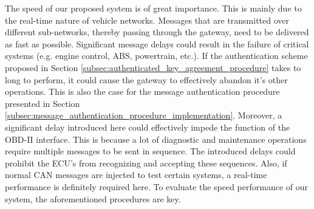 The speed of our proposed system is of great importance. This is mainly due to the real-time nature of vehicle networks. Messages that are transmitted over different sub-networks, thereby passing through the gateway, need to be delivered as fast as possible. Significant message delays could result in the failure of critical systems (e.g. engine control, ABS, powertrain, etc.). If the authentication scheme proposed in Section \ref{subsec:authenticated_key_agreement_procedure} takes to long to perform, it could cause the gateway to effectively abandon it's other operations. This is also the case for the message authentication procedure presented in Section \ref{subsec:message_authentication_procedure_implementation}. Moreover, a significant delay introduced here could effectively impede the function of the OBD-II interface. This is because a lot of diagnostic and maintenance operations require multiple messages to be sent in sequence. The introduced delays could prohibit the ECU's from recognizing and accepting these sequences. Also, if normal CAN messages are injected to test certain systems, a real-time performance is definitely required here. To evaluate the speed performance of our system, the aforementioned procedures are key. 

